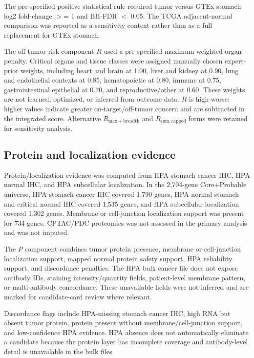 \documentclass[preprint,12pt,authoryear]{elsarticle}
\begin{document}
The pre-specified positive statistical rule required tumor versus GTEx stomach log2 fold-change \ensuremath{>}= 1 and BH-FDR \ensuremath{<} 0.05. The TCGA adjacent-normal comparison was reported as a sensitivity context rather than as a full replacement for GTEx stomach.

The off-tumor risk component $R$ used a pre-specified maximum weighted organ penalty. Critical organs and tissue classes were assigned manually chosen expert-prior weights, including heart and brain at 1.00, liver and kidney at 0.90, lung and endothelial contexts at 0.85, hematopoietic at 0.80, immune at 0.75, gastrointestinal epithelial at 0.70, and reproductive/\allowbreak{}other at 0.60. These weights are not learned, optimized, or inferred from outcome data. $R$ is high-worse: higher values indicate greater on-target/\allowbreak{}off-tumor concern and are subtracted in the integrated score. Alternative $R_{\mathrm{max+breadth}}$ and $R_{\mathrm{sum,capped}}$ forms were retained for sensitivity analysis.

\subsection{Protein and localization evidence}

Protein/\allowbreak{}localization evidence was computed from HPA stomach cancer IHC, HPA normal IHC, and HPA subcellular localization. In the 2,704-gene Core+\allowbreak{}Probable universe, HPA stomach cancer IHC covered 1,790 genes, HPA normal stomach and critical normal IHC covered 1,535 genes, and HPA subcellular localization covered 1,302 genes. Membrane or cell-junction localization support was present for 734 genes. CPTAC/\allowbreak{}PDC proteomics was not assessed in the primary analysis and was not imputed.

The $P$ component combines tumor protein presence, membrane or cell-junction localization support, mapped normal protein safety support, HPA reliability support, and discordance penalties. The HPA bulk cancer file does not expose antibody IDs, staining intensity/\allowbreak{}quantity fields, patient-level membrane pattern, or multi-antibody concordance. These unavailable fields were not inferred and are marked for candidate-card review where relevant.

Discordance flags include HPA-missing stomach cancer IHC, high RNA but absent tumor protein, protein present without membrane/\allowbreak{}cell-junction support, and low-confidence HPA evidence. HPA absence does not automatically eliminate a candidate because the protein layer has incomplete coverage and antibody-level detail is unavailable in the bulk files.
\end{document}
